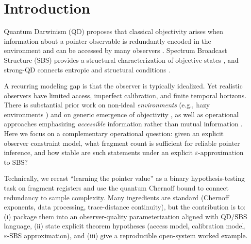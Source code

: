 \documentclass[aps,pra,twocolumn,superscriptaddress,nofootinbib]{revtex4-2}
\newcommand{\1}{\mathbf{1}}
\theoremstyle{definition}
\theoremstyle{plain}
\begin{document}
\section{Introduction}

Quantum Darwinism (QD) proposes that classical objectivity arises when information about a pointer observable is redundantly encoded in the environment and can be accessed by many observers \cite{OPZ2004,Zurek2009,BlumeKohoutZurek2006}.
Spectrum Broadcast Structure (SBS) provides a structural characterization of objective states \cite{HorodeckiKorbiczHorodecki2015,KorbiczReview2021}, and strong-QD connects entropic and structural conditions \cite{LeOlayaCastro2019,KorbiczReview2021}.

A recurring modeling gap is that the observer is typically idealized.
Yet realistic observers have limited access, imperfect calibration, and finite temporal horizons.
There is substantial prior work on non-ideal \emph{environments} (e.g., hazy environments \cite{ZwolakQuanZurek2009}) and on generic emergence of objectivity \cite{BrandaoPianiHorodecki2015,Knott2018}, as well as operational approaches emphasizing \emph{accessible} information rather than mutual information \cite{Touil2022}.
Here we focus on a complementary operational question: given an explicit observer constraint model, what fragment count is sufficient for reliable pointer inference, and how stable are such statements under an explicit $\varepsilon$-approximation to SBS?

Technically, we recast ``learning the pointer value'' as a binary hypothesis-testing task on fragment registers and use the quantum Chernoff bound \cite{Audenaert2007,NussbaumSzkola2009} to connect redundancy to sample complexity.
Many ingredients are standard (Chernoff exponents, data processing, trace-distance continuity), but the contribution is to: (i) package them into an observer-quality parameterization aligned with QD/SBS language, (ii) state explicit theorem hypotheses (access model, calibration model, $\varepsilon$-SBS approximation), and (iii) give a reproducible open-system worked example.
\end{document}
